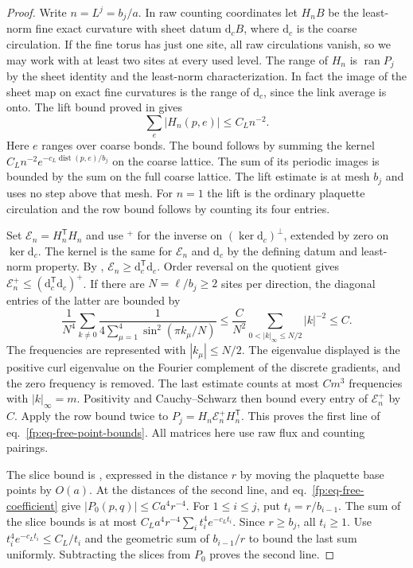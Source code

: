 \documentclass[11pt,letterpaper,reqno]{amsart}
\numberwithin{equation}{section}
\renewcommand{\eqref}[1]{\textup{eq.~\ref{#1}}}
\theoremstyle{definition}
\theoremstyle{remark}
\begin{document}
\begin{proof}
Write \(n=L^j=b_j/a\). In raw counting coordinates let \(H_n B\)
be the least-norm fine exact curvature with sheet datum
\(\mathrm d_c B\), where \(\mathrm d_c\) is the coarse circulation.
If the fine torus has just one site, all raw circulations vanish,
so we may work with at least two sites at every used level.
The range of \(H_n\) is \(\operatorname{ran}P_j\) by the sheet identity and
the least-norm characterization. In fact the image of the sheet
map on exact fine curvatures is the range of \(\mathrm d_c\),
since the link average is onto. The lift bound proved in
\cite[proof of Proposition~6.4]{MB} gives
\[
 \sum_e |H_n(p,e)|\le C_L n^{-2}.
\]
Here \(e\) ranges over coarse bonds. The bound follows by
summing the kernel \(C_L n^{-2}e^{-c_L\operatorname{dist}(p,e)/b_j}\)
on the coarse lattice. The sum of its periodic images is
bounded by the sum on the full coarse lattice. The lift
estimate is at mesh \(b_j\) and uses no step above that mesh.
For \(n=1\) the lift is the ordinary plaquette circulation
and the row bound follows by counting its four entries.

Set \(\mathcal E_n=H_n^{\mathsf T}H_n\) and use \({}^+\) for the
inverse on \((\ker\mathrm d_c)^\perp\), extended by zero on
\(\ker\mathrm d_c\). The kernel is the same for \(\mathcal E_n\)
and \(\mathrm d_c\) by the defining datum and least-norm property.
By \cite[Proposition~4.1]{MB},
\(\mathcal E_n\ge\mathrm d_c^{\mathsf T}\mathrm d_c\).
Order reversal on the quotient gives
\(\mathcal E_n^+\le(\mathrm d_c^{\mathsf T}\mathrm d_c)^+\).
If there are \(N=\ell/b_j\ge2\) sites per direction, the
diagonal entries of the latter are bounded by
\[
 \frac1{N^4}\sum_{k\ne0}
       \frac1{4\sum_{\mu=1}^4\sin^2(\pi k_\mu/N)}
 \le \frac C{N^2}\sum_{0<|k|_\infty\le N/2}|k|^{-2}
 \le C .
\]
The frequencies are represented with \(|k_\mu|\le N/2\).
The eigenvalue displayed is the positive curl eigenvalue on
the Fourier complement of the discrete gradients, and the
zero frequency is removed. The last estimate counts at most
\(C m^3\) frequencies with \(|k|_\infty=m\).
Positivity and Cauchy--Schwarz then bound every entry of
\(\mathcal E_n^+\) by \(C\). Apply the row bound twice to
\(P_j=H_n\mathcal E_n^+H_n^{\mathsf T}\). This proves the first
line of \eqref{fp:eq-free-point-bounds}. All matrices here
use raw flux and counting pairings.

The slice bound is \cite[Proposition~6.4]{MB}, expressed in the
distance \(r\) by moving the plaquette base points by \(O(a)\).
At the distances of the second line, \cite[Proposition~8.3]{GI}
and \eqref{fp:eq-free-coefficient} give \(|P_0(p,q)|\le Ca^4r^{-4}\).
For \(1\le i\le j\), put \(t_i=r/b_{i-1}\).
The sum of the slice bounds is at most
\(C_L a^4r^{-4}\sum_i t_i^4e^{-c_Lt_i}\).
Since \(r\ge b_j\), all \(t_i\ge1\). Use
\(t_i^4e^{-c_Lt_i}\le C_L/t_i\) and the geometric sum of
\(b_{i-1}/r\) to bound the last sum uniformly. Subtracting the
slices from \(P_0\) proves the second line.
\end{proof}
\end{document}
